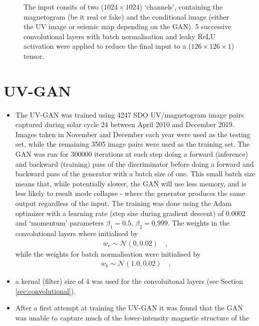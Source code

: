 \documentclass[11pt,a4paper,onecolumn]{report}
\begin{document}
\begin{figure}[h]
  \centering
  \caption{
    The input consits of two ($1024\times 1024$) `channels', containing the
    magnetogram (be it real or fake) and the conditional image (either the UV
    image or seismic map depending on the GAN). 5 successive convolutional
    layers with batch normalisation and leaky ReLU activation were applied to
    reduce the final input to a ($126\times 126 \times 1$) tensor.
  }
  \label{fig:discrim_model}
\end{figure}



\section{UV-GAN}
\begin{itemize}
  \item The UV-GAN was trained using 4247 SDO UV/magnetogram image pairs
  captured during solar cycle 24 between April 2010 and December 2019. Images
  taken in November and December each year were used as the testing set, while
  the remaining 3505 image pairs were used as the training set. The GAN was run
  for $300000$ iterations at each step doing a forward (inference) and backward
  (training) pass of the discriminator before doing a forward and backward pass
  of the generator with a batch size of one. This small batch size means that,
  while potentially slower, the GAN will use less memory, and is less likely to
  result mode collapse - where the generator produces the same output regardless
  of the input. The training was done using the Adam optimizer
  \citep{kingma_adam_2014} with a learning rate (step size during gradient
  descent) of $0.0002$ and `momentum' parameters $\beta_1 = 0.5$, $\beta_2 =
  0.999$. The weights in the convolutional layers where initialised by
  \begin{align}
    w_c \sim \mathcal{N}\left(0, 0.02\right) \quad ,
  \end{align}
  while the weights for batch normalisation were initialised by
  \begin{align}
    w_b \sim \mathcal{N}\left(1.0, 0.02\right) \quad .
  \end{align}
  \item a kernal (filter) size of $4$ was used for the convoluitonal layers (see
  Section \ref{sec:convolutional}).
  \item After a first attempt at training the UV-GAN it was found that the GAN
  was unable to capture much of the lower-intensity magnetic structure of the

\end{itemize}
\end{document}
